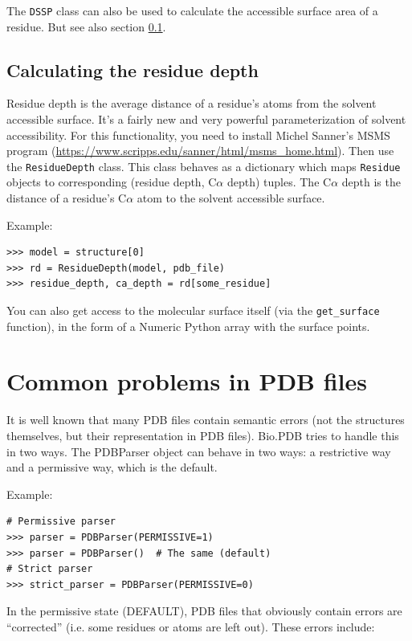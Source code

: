 The \texttt{DSSP} class can also be used to calculate the accessible surface area of a residue. But see also section \ref{sec:residue_depth}.

\subsection{Calculating the residue depth}
\label{sec:residue_depth}

Residue depth is the average distance of a residue's atoms from the
solvent accessible surface. It's a fairly new and very powerful parameterization
of solvent accessibility. For this functionality, you need to install
Michel Sanner's MSMS program (\url{https://www.scripps.edu/sanner/html/msms_home.html}).
Then use the \texttt{ResidueDepth} class. This class behaves as a
dictionary which maps \texttt{Residue} objects to corresponding (residue
depth, C$\alpha$ depth) tuples. The C$\alpha$ depth is the distance
of a residue's C$\alpha$ atom to the solvent accessible surface.

Example:

\begin{verbatim}
>>> model = structure[0]
>>> rd = ResidueDepth(model, pdb_file)
>>> residue_depth, ca_depth = rd[some_residue]
\end{verbatim}
You can also get access to the molecular surface itself (via the \texttt{get\_surface}
function), in the form of a Numeric Python array with the surface points.

\section{Common problems in PDB files}

It is well known that many PDB files contain semantic errors (not the
structures themselves, but their representation in PDB files).
Bio.PDB tries to handle this in two ways. The PDBParser
object can behave in two ways: a restrictive way and a permissive
way, which is the default.

Example:

\begin{verbatim}
# Permissive parser
>>> parser = PDBParser(PERMISSIVE=1)
>>> parser = PDBParser()  # The same (default)
# Strict parser
>>> strict_parser = PDBParser(PERMISSIVE=0)
\end{verbatim}
In the permissive state (DEFAULT), PDB files that obviously contain
errors are ``corrected'' (i.e. some residues or atoms are left out).
These errors include:

